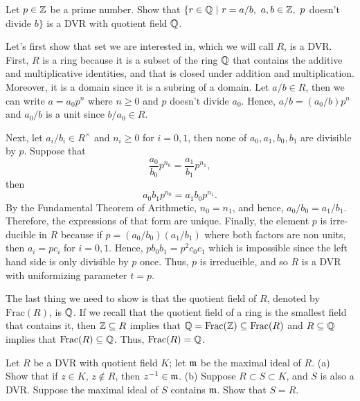 \begin{exercise}
    Let $p \in \mathbb{Z}$ be a prime number. Show that $\{r \in \mathbb{Q} \ | \ r = a/b, \ a,b \in \mathbb{Z}, \ p$ doesn't divide $b\}$ is a DVR with quotient field $\mathbb{Q}$. \\
\end{exercise}

\begin{solution}
    Let's first show that set we are interested in, which we will call $R$, is a DVR. First, $R$ is a ring because it is a subset of the ring $\mathbb{Q}$ that contains the additive and multiplicative identities, and that is closed under addition and multiplication. Moreover, it is a domain since it is a subring of a domain. Let $a/b \in R$, then we can write $a = a_0 p^n$ where $n \geq 0$ and $p$ doesn't divide $a_0$. Hence, $a/b = (a_0/b)p^n$ and $a_0/b$ is a unit since $b/a_0 \in R$. 
    
    Next, let $a_i/b_i \in R^{\times}$ and $n_i \geq 0$ for $i = 0,1$, then none of $a_0, a_1, b_0, b_1$ are divisible by $p$. Suppose that
    $$\frac{a_0}{b_0}p^{n_0} = \frac{a_1}{b_1}p^{n_1},$$
    then 
    $$a_0b_1p^{n_0} = a_1b_0 p^{n_1}.$$
    By the Fundamental Theorem of Arithmetic, $n_0 = n_1$, and hence, $a_0/b_0 = a_1/b_1$. Therefore, the expressions of that form are unique. Finally, the element $p$ is irre-ducible in $R$ because if $p = (a_0/b_0)(a_1/b_1)$ where both factors are non units, then $a_i = pc_i$ for $i = 0,1$. Hence, $pb_0b_1 = p^2 c_0c_1$ which is impossible since the left hand side is only divisible by $p$ once. Thus, $p$ is irreducible, and so $R$ is a DVR with uniformizing parameter $t = p$.
    
    The last thing we need to show is that the quotient field of $R$, denoted by $\text{Frac}(R)$, is $\mathbb{Q}$. If we recall that the quotient field of a ring is the smallest field that contains it, then $\mathbb{Z} \subseteq R$ implies that $\mathbb{Q} = \text{Frac}(\mathbb{Z}) \subseteq \text{Frac}(R)$ and $R \subseteq \mathbb{Q}$ implies that $\text{Frac}(R) \subseteq \mathbb{Q}$. Thus, $\text{Frac}(R) = \mathbb{Q}$. \\
\end{solution}

\begin{exercise}
    Let $R$ be a DVR with quotient field $K$; let $\mathfrak{m}$ be the maximal ideal of $R$. (a) Show that if $z \in K$, $z \notin R$, then $z^{-1} \in \mathfrak{m}$. (b) Suppose $R \subset S \subset K$, and $S$ is also a DVR. Suppose the maximal ideal of $S$ contains $\mathfrak{m}$. Show that $S = R$. \\
\end{exercise}

